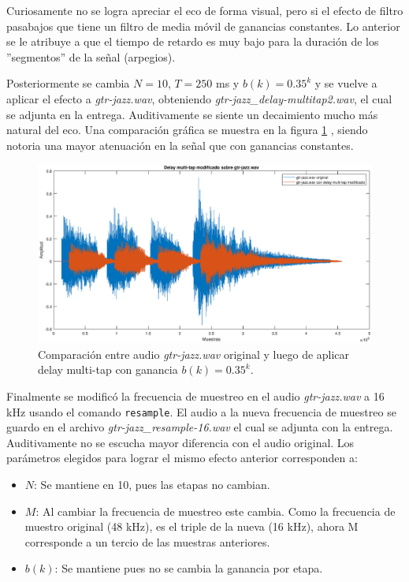 Curiosamente no se logra apreciar el eco de forma visual, pero si el efecto de filtro pasabajos que tiene un filtro de media móvil de ganancias constantes. Lo anterior se le atribuye a que el tiempo de retardo es muy bajo para la duración de los ''segmentos'' de la señal (arpegios).

Posteriormente se cambia $N=10$, $T = 250$ ms y $b(k) = 0.35^k$ y se vuelve a aplicar el efecto a \textit{gtr-jazz.wav}, obteniendo \textit{gtr-jazz\_delay-multitap2.wav}, el cual se adjunta en la entrega. Auditivamente se siente un decaimiento mucho más natural del eco. Una comparación gráfica se muestra en la figura \ref{fig:p222} , siendo notoria una mayor atenuación en la señal que con ganancias constantes.

\begin{figure}[H]
    \centering
    \includegraphics[width = .8\linewidth]{Figuras/p222_comparacion-delay.eps}
    \caption{Comparación entre audio \textit{gtr-jazz.wav} original y luego de aplicar delay multi-tap con ganancia $b(k) = 0.35^k$.}
    \label{fig:p222}
\end{figure}

Finalmente se modificó la frecuencia de muestreo en el audio \textit{gtr-jazz.wav} a 16 kHz usando el comando \texttt{resample}. El audio a la nueva frecuencia de muestreo se guardo en el archivo \textit{gtr-jazz\_resample-16.wav} el cual se adjunta con la entrega. Auditivamente no se escucha mayor diferencia con el audio original. Los parámetros elegidos para lograr el mismo efecto anterior corresponden a:
\begin{itemize}
    \item $N$: Se mantiene en 10, pues las etapas no cambian.
    \item $M$: Al cambiar la frecuencia de muestreo este cambia. Como la frecuencia de muestro original (48 kHz), es el triple de la nueva (16 kHz), ahora M corresponde a un tercio de las muestras anteriores.
    \item $b(k)$: Se mantiene pues no se cambia la ganancia por etapa.
\end{itemize}

